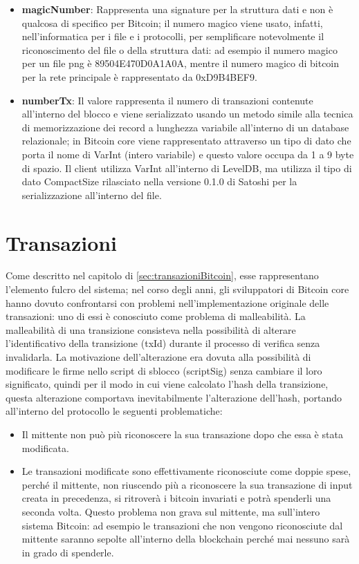 \begin{itemize}
  \setlength\itemsep{1em}
  \item {\bf magicNumber\/}: Rappresenta una signature per la struttura dati e non è qualcosa di specifico per Bitcoin; il numero magico viene usato, infatti, nell’informatica per i file e i protocolli, per semplificare notevolmente il riconoscimento del file o della struttura dati: ad esempio il numero magico per un file png è 89504E470D0A1A0A, mentre il numero magico di bitcoin per la rete principale è rappresentato da 0xD9B4BEF9.
  \item {\bf numberTx\/}: Il valore rappresenta il numero di transazioni contenute all'interno del blocco e viene serializzato usando un metodo simile alla tecnica di memorizzazione dei record a lunghezza variabile all’interno di un database relazionale; in Bitcoin core viene rappresentato attraverso un tipo di dato che porta il nome di VarInt (intero variabile) e questo valore occupa da 1 a 9 byte di spazio.
  Il client utilizza VarInt all’interno di LevelDB, ma utilizza il tipo di dato CompactSize rilasciato nella versione 0.1.0 di Satoshi per la serializzazione all’interno del file.
\end{itemize}

\section{Transazioni}
\label{sec:transazionibitcoincore}
Come descritto nel capitolo di \ref{sec:transazioniBitcoin}, esse rappresentano l’elemento fulcro del sistema; nel corso degli anni, gli sviluppatori di Bitcoin core hanno dovuto confrontarsi con problemi nell’implementazione originale delle transazioni: uno di essi è conosciuto come problema di malleabilità.
La malleabilità di una transizione consisteva nella possibilità di alterare l’identificativo della transizione (txId) durante il processo di verifica senza invalidarla. La motivazione dell’alterazione era dovuta alla possibilità di modificare le firme nello script di sblocco (scriptSig) senza cambiare il loro significato, quindi per il modo in cui viene calcolato l’hash della transizione, questa alterazione comportava inevitabilmente l’alterazione dell’hash, portando all’interno del protocollo le seguenti problematiche:
\begin{itemize}
  \item Il mittente non può più riconoscere la sua transazione dopo che essa è stata modificata.
  \item Le transazioni modificate sono effettivamente riconosciute come doppie spese, perché il mittente, non riuscendo più a riconoscere la sua transazione di input creata in precedenza, si ritroverà i bitcoin invariati e potrà spenderli una seconda volta.
  Questo problema non grava sul mittente, ma sull’intero sistema Bitcoin: ad esempio le transazioni che non vengono riconosciute dal mittente saranno sepolte all’interno della blockchain perché mai nessuno sarà in grado di spenderle.
\end{itemize}

